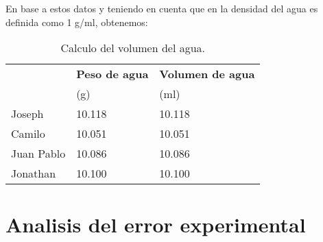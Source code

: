 \documentclass[letterpaper]{IEEEconf}
\begin{document}
En base a estos datos y teniendo en cuenta que en \cite{atares} la densidad del agua es definida como 1 g/ml,  obtenemos:

\begin{table}[H]
\centering
\begin{tabular}{|p{2cm}|p{2cm}|p{2cm}|}
\hline
 & \bfseries Peso de agua & \bfseries Volumen de agua \\
 & (g) & (ml) \\
\hline
Joseph & 10.118 & 10.118 \\
\hline
Camilo & 10.051 & 10.051 \\
\hline
Juan Pablo & 10.086 & 10.086 \\
\hline
Jonathan & 10.100 & 10.100 \\
\hline
\end{tabular}
\caption{Calculo del volumen del agua.}
\label{tab:volumen}
\end{table}

\section{Analisis del error experimental}



\printbibliography %



\end{document}
